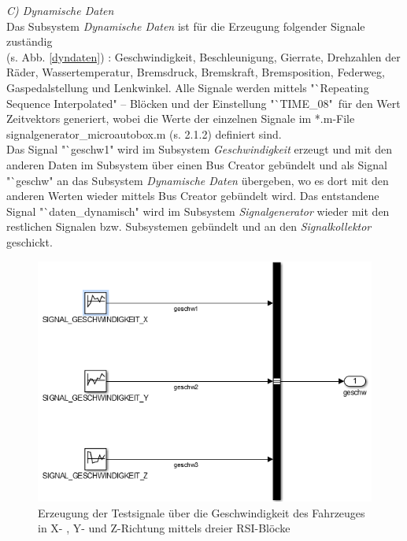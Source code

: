 \documentclass[fontsize = 12pt, paper = a4]{scrreprt}
\begin{document}
\textit{C) Dynamische Daten} \\

Das Subsystem \textit{Dynamische Daten} ist für die Erzeugung folgender Signale zuständig \\ (s. Abb. \ref{dyndaten}) : Geschwindigkeit, Beschleunigung, Gierrate, Drehzahlen der Räder, Wassertemperatur, Bremsdruck, Bremskraft, Bremsposition, Federweg, Gaspedalstellung und Lenkwinkel. Alle Signale werden mittels "`Repeating Sequence Interpolated" -- Blöcken und der Einstellung "`TIME\_08"\ für den  Wert Zeitvektors generiert, wobei die Werte der einzelnen Signale im *.m-File signalgenerator\_microautobox.m (s. 2.1.2) definiert sind. \\

Das Signal "`geschw1" wird im Subsystem \textit{Geschwindigkeit} erzeugt und mit den anderen Daten im Subsystem über einen Bus Creator gebündelt und als Signal "`geschw" an das Subsystem \textit{Dynamische Daten} übergeben, wo es dort mit den anderen Werten wieder mittels Bus Creator gebündelt wird. Das entstandene Signal "`daten\_dynamisch" wird im Subsystem \textit{Signalgenerator} wieder mit den restlichen Signalen bzw. Subsystemen gebündelt und an den \textit{Signalkollektor} geschickt.

\newpage

\begin{figure}[h]
\centering
\includegraphics[scale = 0.85]{makegeschwindigkeit}
\caption[Generierung der Testsignale für die Geschwindigkeit des Fahrzeuges]{Erzeugung der Testsignale über die Geschwindigkeit des Fahrzeuges in X- , Y- und Z-Richtung mittels dreier RSI-Blöcke}
\label{makegeschwindigkeit}
\end{figure}
\end{document}
